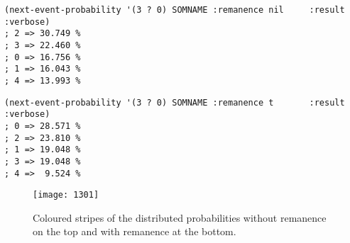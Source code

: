 \begin{lstlisting}[language=N3]
(next-event-probability '(3 ? 0) SOMNAME :remanence nil     :result :verbose) 
; 2 => 30.749 %
; 3 => 22.460 %
; 0 => 16.756 %
; 1 => 16.043 %
; 4 => 13.993 %
\end{lstlisting}


\begin{lstlisting}[language=N3]
(next-event-probability '(3 ? 0) SOMNAME :remanence t       :result :verbose) 
; 0 => 28.571 %
; 2 => 23.810 %
; 1 => 19.048 %
; 3 => 19.048 %
; 4 =>  9.524 %
\end{lstlisting}

\begin{figure}[htbp]
\begin{center}
\texttt{[image: 1301]}
\caption{Coloured stripes of the distributed probabilities without remanence on the top and with remanence at the bottom.}
\label{fig:colstr}
\end{center}
\end{figure}



